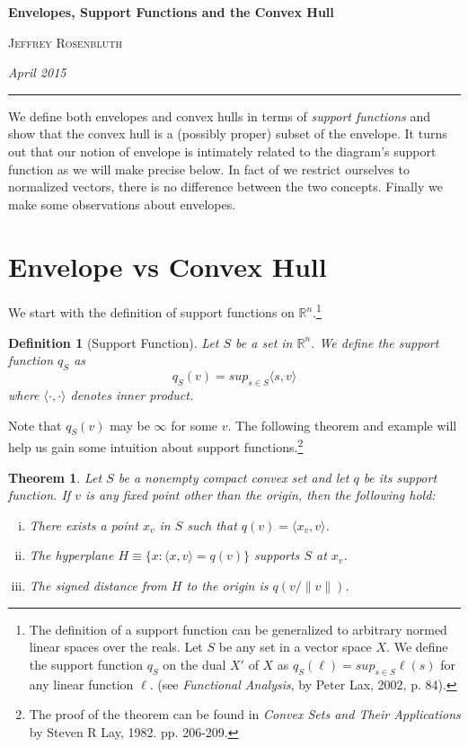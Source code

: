 \documentclass[11pt]{amsart}
\newtheorem{defn}{Definition}
\newtheorem{thm}{Theorem}
\begin{document}
\begin{center}
\bigskip 
\textbf{Envelopes, Support Functions and the Convex Hull}

\textsc{Jeffrey Rosenbluth}

\textit{April 2015}
\end{center}
\hrule
\vspace{0.25in}

We define both envelopes and convex hulls in terms of \emph{support functions} and show
that the convex hull is a (possibly proper) subset of the envelope. It turns out that our notion of
envelope is intimately related to the diagram's support function as we will make precise below.
In fact of we restrict ourselves to normalized vectors, there is no difference between the two concepts.
Finally we make some observations about envelopes. 

\section{Envelope vs Convex Hull}

We start with the definition of support functions
on  $\mathbb{R}^n$.\footnote{
The definition of a support function can be generalized to arbitrary normed linear spaces over the reals.
Let $S$ be any set in a vector space $X$. We define the support function $q_S$ on the dual $X'$ of $X$ as 
$q_S(\ell) = sup_{s \in S} \ell(s)$
for any linear function $\ell.$ 
(see \emph{Functional Analysis}, by Peter Lax, 2002, p. 84).
}
\begin{defn}[Support Function]
\label{supportfunc}
Let $S$ be a set in $\mathbb{R}^n$. We define the support function $q_S$ as 
$$q_S(v) = sup_{s \in S} \langle s,v \rangle$$
where $\langle \cdot, \cdot \rangle$ denotes inner product.
\end{defn}

Note that $q_S(v)$ may be $\infty$ for some $v$. The following theorem
and example will help us gain some intuition about support functions.\footnote{The proof of the theorem can
be found in \emph{Convex Sets and Their Applications} by Steven R Lay, 1982. pp. 206-209.} 

\begin{thm}
Let $S$ be a nonempty compact convex set and let $q$ be its support function. If $v$ is any fixed point other
than the origin, then the following hold:
\begin{enumerate}[i.]
\item There exists a point $x_v$ in $S$ such that $q(v)=\langle x_v, v \rangle$.
\item The hyperplane $H \equiv \{x : \langle x, v \rangle = q(v)\}$ supports $S$ at $x_v$.
\item The signed distance from $H$ to the origin is $q(v/\|v\|)$.
\end{enumerate}
\end{thm}
\end{document}
